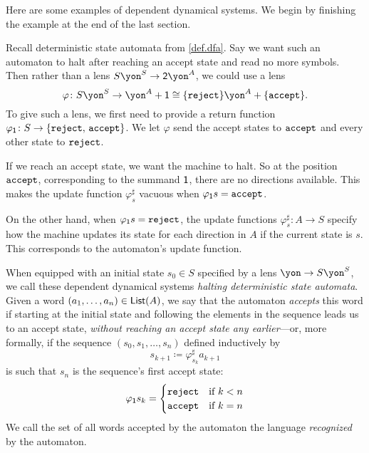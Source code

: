 \documentclass[Book-Poly]{subfiles}
\begin{document}
Here are some examples of dependent dynamical systems.
We begin by finishing the example at the end of the last section.


\begin{example}\label{ex.regular_lang_stop}
Recall deterministic state automata from \cref{def.dfa}.
Say we want such an automaton to halt after reaching an accept state and read no more symbols.
Then rather than a lens $S\yon^S\to \2\yon^A$, we could use a lens
\[
  \varphi\colon S\yon^S\to \yon^A+\1\iso\{\const{reject}\}\yon^A+\{\const{accept}\}.
\]
To give such a lens, we first need to provide a return function $\varphi_{\textsf{1}}\colon S\to\{\texttt{reject},\,\texttt{accept}\}$.
We let $\varphi$ send the accept states to $\texttt{accept}$ and every other state to $\texttt{reject}$.

If we reach an accept state, we want the machine to halt.
So at the position $\texttt{accept}$, corresponding to the summand $\textsf{1}$, there are no directions available.
This makes the update function $\varphi^\sharp_s$ vacuous when $\varphi_{\textsf{1}}s=\texttt{accept}$.

On the other hand, when $\varphi_{\textsf{1}}s=\texttt{reject}$, the update functions $\varphi^\sharp_s\colon A\to S$ specify how the machine updates its state for each direction in $A$ if the current state is $s$.
This corresponds to the automaton's update function.

When equipped with an initial state $s_0\in S$ specified by a lens $\yon\to S\yon^S$, we call these dependent dynamical systems \emph{halting deterministic state automata}.
Given a word $(a_1,\ldots,a_n)\in\mathsf{List}(A)$, we say that the automaton \emph{accepts} this word if starting at the initial state and following the elements in the sequence leads us to an accept state, \emph{without reaching an accept state any earlier}---or, more formally, if the sequence $(s_0,s_1,\ldots,s_n)$ defined inductively by
\[
  s_{k+1}\coloneqq \varphi^\sharp_{s_k}a_{k+1}
\]
is such that $s_n$ is the sequence's first accept state:
\[
  \varphi_{\textsf{1}}s_k=\begin{cases}
    \texttt{reject} & \text{if } k<n \\
    \texttt{accept} & \text{if } k=n
  \end{cases}
\]
We call the set of all words accepted by the automaton the language \emph{recognized} by the automaton.
\end{example}
\end{document}
